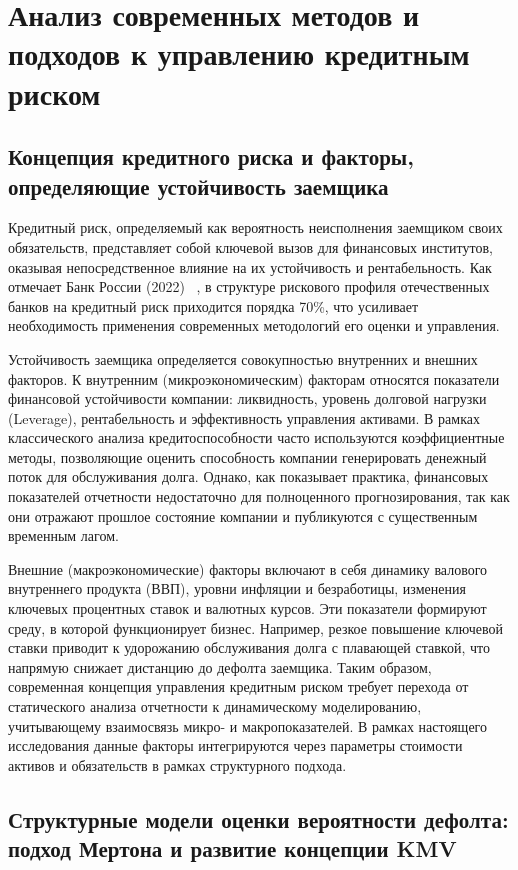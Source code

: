 \documentclass[]{article}
\begin{document}
	\newpage
	\section{Анализ современных методов и подходов к управлению кредитным риском}

	\subsection{Концепция кредитного риска и факторы, определяющие устойчивость заемщика}

	Кредитный риск, определяемый как вероятность неисполнения заемщиком своих обязательств, представляет собой
	ключевой вызов для финансовых институтов, оказывая непосредственное влияние на их устойчивость и
	рентабельность. Как отмечает Банк России (2022) ~\cite{cbr}, в структуре рискового профиля отечественных
	банков на кредитный риск приходится порядка 70\%, что усиливает необходимость применения современных
	методологий его оценки и управления.

	Устойчивость заемщика определяется совокупностью внутренних и внешних факторов. К внутренним
	(микроэкономическим) факторам относятся показатели финансовой устойчивости компании: ликвидность, уровень
	долговой нагрузки (Leverage), рентабельность и эффективность управления активами. В рамках классического анализа
	кредитоспособности часто используются коэффициентные методы, позволяющие оценить способность компании
	генерировать денежный поток для обслуживания долга. Однако, как показывает практика, финансовых показателей
	отчетности недостаточно для полноценного прогнозирования, так как они отражают прошлое состояние компании и
	публикуются с существенным временным лагом.

	Внешние (макроэкономические) факторы включают в себя динамику валового внутреннего продукта (ВВП), уровни
	инфляции и безработицы, изменения ключевых процентных ставок и валютных курсов. Эти показатели формируют среду, в
	которой функционирует бизнес. Например, резкое повышение ключевой ставки приводит к удорожанию обслуживания долга
	с плавающей ставкой, что напрямую снижает дистанцию до дефолта заемщика. Таким образом, современная концепция
	управления кредитным риском требует перехода от статического анализа отчетности к динамическому моделированию,
	учитывающему взаимосвязь микро- и макропоказателей. В рамках настоящего исследования данные факторы интегрируются
	через параметры стоимости активов и обязательств в рамках структурного подхода.

	\subsection{Структурные модели оценки вероятности дефолта: подход Мертона и развитие концепции KMV}
\end{document}
